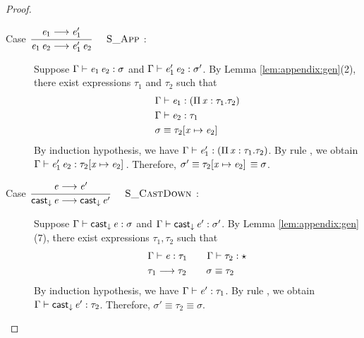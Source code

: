 \begin{proof}
\begin{description}
        \item[Case ${\displaystyle\frac{\begin{array}{l} {\mathit{e_{{\mathrm{1}}}} \longrightarrow \mathit{e'_{{\mathrm{1}}}}} \end{array}}{ \mathit{e_{{\mathrm{1}}}} \, \mathit{e_{{\mathrm{2}}}} \longrightarrow \mathit{e'_{{\mathrm{1}}}} \, \mathit{e_{{\mathrm{2}}}}}\quad\textsc{ {\textsc{S\_App}}{} }}$:] $\quad$ \\
        Suppose $\Gamma  \vdash  \mathit{e_{{\mathrm{1}}}} \, \mathit{e_{{\mathrm{2}}}}  :  \sigma$ and $\Gamma  \vdash  \mathit{e'_{{\mathrm{1}}}} \, \mathit{e_{{\mathrm{2}}}}  :  \sigma'$. By Lemma
\ref{lem:appendix:gen}(2), there exist expressions $\tau_{{\mathrm{1}}}$ and $\tau_{{\mathrm{2}}}$ such
that 
        \begin{align*}
            &\Gamma  \vdash  \mathit{e_{{\mathrm{1}}}}  :  (  \Pi \, \mathit{x}  :  \tau_{{\mathrm{1}}}  .  \tau_{{\mathrm{2}}}  ) \\
            &\Gamma  \vdash  \mathit{e_{{\mathrm{2}}}}  :  \tau_{{\mathrm{1}}}\\
            &\sigma  \equiv  \tau_{{\mathrm{2}}}  [  \mathit{x}  \mapsto  \mathit{e_{{\mathrm{2}}}}  ] \,
        \end{align*}
        By induction hypothesis, we have $\Gamma  \vdash  \mathit{e'_{{\mathrm{1}}}}  :  (  \Pi \, \mathit{x}  :  \tau_{{\mathrm{1}}}  .  \tau_{{\mathrm{2}}}  )$. By rule
, we obtain $\Gamma  \vdash  \mathit{e'_{{\mathrm{1}}}} \, \mathit{e_{{\mathrm{2}}}}  :  \tau_{{\mathrm{2}}}  [  \mathit{x}  \mapsto  \mathit{e_{{\mathrm{2}}}}  ] \,$. Therefore, $\sigma'  \equiv  \tau_{{\mathrm{2}}}  [  \mathit{x}  \mapsto  \mathit{e_{{\mathrm{2}}}}  ] \,  \equiv  \sigma$.
        
        \item[Case ${\displaystyle\frac{\begin{array}{l} {\mathit{e} \longrightarrow \mathit{e'}} \end{array}}{ \mathsf{cast}_{\downarrow} \, \mathit{e} \longrightarrow \mathsf{cast}_{\downarrow} \, \mathit{e'}}\quad\textsc{ {\textsc{S\_CastDown}}{} }}$:] $\quad$ \\
        Suppose $\Gamma  \vdash  \mathsf{cast}_{\downarrow} \, \mathit{e}  :  \sigma$ and $\Gamma  \vdash  \mathsf{cast}_{\downarrow} \, \mathit{e'}  :  \sigma'$. By
Lemma \ref{lem:appendix:gen}(7), there exist expressions $\tau_{{\mathrm{1}}}, \tau_{{\mathrm{2}}}$ such
that 
        \begin{align*}
            &\Gamma  \vdash  \mathit{e}  :  \tau_{{\mathrm{1}}} \qquad \Gamma  \vdash  \tau_{{\mathrm{2}}}  :  \star \\
            &\tau_{{\mathrm{1}}}  \longrightarrow  \tau_{{\mathrm{2}}} \qquad \sigma  \equiv  \tau_{{\mathrm{2}}}
        \end{align*}
        By induction hypothesis, we have $\Gamma  \vdash  \mathit{e'}  :  \tau_{{\mathrm{1}}}$. By rule
, we obtain $\Gamma  \vdash  \mathsf{cast}_{\downarrow} \, \mathit{e'}  :  \tau_{{\mathrm{2}}}$. Therefore, $\sigma'  \equiv  \tau_{{\mathrm{2}}}  \equiv  \sigma$.
        

\end{description}
\end{proof}
